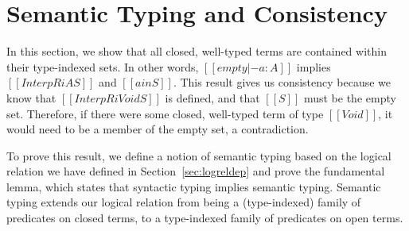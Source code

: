 \documentclass[acmsmall,screen=true,
\ifpublic review=false\else,review=true\fi
  ,anonymous=\ifanonymous true\else false\fi]{acmart}
\newcommand{\lang}{$\lambda^{U\mathbb{B}\ottkw{Id}}$\xspace}
\newcommand{\scw}[1]{}
\newcommand{\yl}[1]{}
\begin{document}
\section{Semantic Typing and Consistency}
\label{sec:logrelproof}
\yl{todo: rename all variables from i,j to n}
\scw{Would it make sense to define the notation $a \in [\![A]\!]^i$ when
there exists some $S$ such that $[[InterpR i A S]]$ and $[[a in S]]$ ?}



In this section, we show that all closed, well-typed terms are contained
within their type-indexed sets. In other words, $[[empty |- a : A]]$ implies
$[[InterpR i A S]]$ and $[[a in S]]$.  This result gives us consistency
because we know that $[[InterpR i Void S]]$ is defined, and that $[[S]]$ must
be the empty set. Therefore, if there were some closed, well-typed term of type
$[[Void]]$, it would need to be a member of the empty set, a contradiction.

To prove this result, we define a notion of semantic typing based on the
logical relation we have defined in Section~\ref{sec:logreldep} and prove the
fundamental lemma, which states that syntactic typing implies semantic typing.
Semantic typing extends our logical relation from being a (type-indexed)
family of predicates on closed terms, to a type-indexed family of predicates
on open terms.
\end{document}
